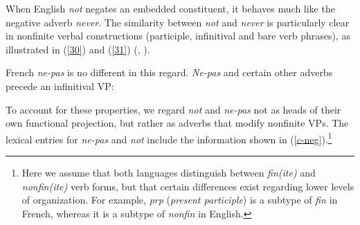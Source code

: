 \documentclass[output=paper]{langsci/langscibook}
\begin{document}
{\begin{exe}
\begin{xlist}
\begin{exe}
\begin{xlist}
When English {\it not} negates an embedded constituent, it behaves
much like the negative adverb {\it never}. The similarity between {\it
not} and {\it never} is particularly clear in nonfinite verbal
constructions (participle, infinitival and bare verb phrases), as
illustrated in (\ref{30}) and (\ref{31}) (\citet{Klima:64}, \citet{Baker:89,Baker:91}).

\eal\label{30}
\zl

\eal\label{31}
\zl

\noindent
French {\it ne-pas} is no different in this regard.  {\it Ne-pas} and
certain other adverbs precede an infinitival VP:



\eal
{}
\zl


To account for these properties, we regard {\it not} and {\it ne-pas} not as
heads of their own functional projection, but rather as adverbs that modify
nonfinite VPs. The lexical entries for {\it ne-pas} and {\it not} include the
information shown in (\ref{c-neg}).\footnote{Here we assume that both languages
distinguish between {\it fin(ite)} and {\it nonfin(ite)} verb forms, but that
certain differences exist regarding lower levels of organization. For example,
{\it prp} ({\it present participle}) is a subtype of {\it fin} in French,
whereas it is a subtype of {\it nonfin} in English.


}
\end{xlist}
\end{exe}
\end{xlist}
\end{exe}}
\end{document}
